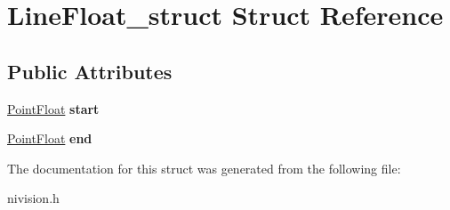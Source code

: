 \hypertarget{structLineFloat__struct}{
\section{LineFloat\_\-struct Struct Reference}
\label{structLineFloat__struct}
}
\subsection*{Public Attributes}
\begin{DoxyCompactItemize}
\item 
\hypertarget{structLineFloat__struct_a10e78867a8f8e9c0d39cf12ac0fae9c3}{
\hyperlink{structPointFloat__struct}{PointFloat} {\bfseries start}}
\label{structLineFloat__struct_a10e78867a8f8e9c0d39cf12ac0fae9c3}

\item 
\hypertarget{structLineFloat__struct_a90fcc40c1d2c12c382f0a7c055b12de7}{
\hyperlink{structPointFloat__struct}{PointFloat} {\bfseries end}}
\label{structLineFloat__struct_a90fcc40c1d2c12c382f0a7c055b12de7}

\end{DoxyCompactItemize}


The documentation for this struct was generated from the following file:\begin{DoxyCompactItemize}
\item 
nivision.h\end{DoxyCompactItemize}
